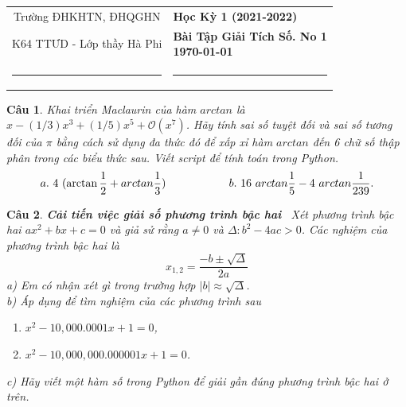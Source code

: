 \documentclass[answers]{exam}
\newtheorem{bt}{Câu}
\begin{document}
\begin{tabular*}
	{\linewidth}{c>{\centering\hspace{0pt}} p{}}
	Trường ĐHKHTN, ĐHQGHN & {\bf Học Kỳ 1 (2021-2022)}
	\tabularnewline
	{K64 TTƯD - Lớp thầy Hà Phi} & {\bf Bài Tập Giải Tích Số. No 1 \\ \today}
	\tabularnewline
	\rule{1in}{1pt}  \small  & \rule{2in}{1pt} %
	\tabularnewline
	
\end{tabular*}
%
\printanswers


\begin{bt}
	Khai triển Maclaurin của hàm $arctan$ là $x - (1/3)x^3 + (1/5)x^5 + \mathcal{O}(x^7)$. Hãy tính sai số tuyệt đối và sai số tương đối của $\pi$ bằng cách sử dụng đa thức đó để xấp xỉ hàm $arctan$ đến 6 chữ số thập phân trong các biểu thức sau. Viết script để tính toán trong Python.
	\begin{equation*} 
		a.\ 4 \ (\arctan \frac{1}{2} + arctan \frac{1}{3}) \hskip 2cm b.\ 16 \ arctan \frac{1}{5} - 4 \ arctan \frac{1}{239}.
	\end{equation*}
\end{bt}

\begin{bt} \textbf{Cải tiến việc giải số phương trình bậc hai} \ Xét phương trình bậc hai $ax^2 + bx+c = 0$ và giả sử rằng $a\not= 0$ và $\Delta : b^2-4ac>0$. Các nghiệm của phương trình bậc hai là
	\[
	x_{1,2} =  \dfrac{-b \pm \sqrt{\Delta}}{2a}
	\]
	a) Em có nhận xét gì trong trường hợp $|b| \approx \sqrt{\Delta}$. \\
	b) Áp dụng để tìm nghiệm của các phương trình sau
	\begin{enumerate}
		\item[i)] $x^2 - 10,000.0001 x + 1 = 0$, 
		\item[ii)] $x^2 - 10,000,000.000001 x + 1 = 0$.
	\end{enumerate}
	c) Hãy viết một hàm số trong Python để giải gần đúng phương trình bậc hai ở trên.
\end{bt}
\end{document}
